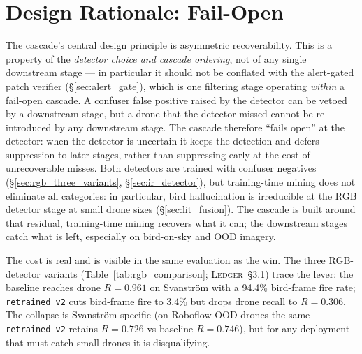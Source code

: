 \documentclass[12pt,a4paper,oneside,openright]{book}
\begin{document}
\section{Design Rationale: Fail-Open}
\label{sec:design_rationale}

The cascade's central design principle is asymmetric recoverability. This is a property of the \emph{detector choice and cascade ordering}, not of any single downstream stage --- in particular it should not be conflated with the alert-gated patch verifier (\S\ref{sec:alert_gate}), which is one filtering stage operating \emph{within} a fail-open cascade. A confuser false positive raised by the detector can be vetoed by a downstream stage, but a drone that the detector missed cannot be re-introduced by any downstream stage. The cascade therefore ``fails open'' at the detector: when the detector is uncertain it keeps the detection and defers suppression to later stages, rather than suppressing early at the cost of unrecoverable misses. Both detectors are trained with confuser negatives (\S\ref{sec:rgb_three_variants}, \S\ref{sec:ir_detector}), but training-time mining does not eliminate all categories: in particular, bird hallucination is irreducible at the RGB detector stage at small drone sizes (\S\ref{sec:lit_fusion}). The cascade is built around that residual, training-time mining recovers what it can; the downstream stages catch what is left, especially on bird-on-sky and OOD imagery.

The cost is real and is visible in the same evaluation as the win. The three RGB-detector variants (Table~\ref{tab:rgb_comparison}; \textsc{Ledger}~\S3.1) trace the lever: the baseline reaches drone $R=0.961$ on Svanstr\"om with a 94.4\% bird-frame fire rate; \texttt{retrained\_v2} cuts bird-frame fire to 3.4\% but drops drone recall to $R=0.306$. The collapse is Svanstr\"om-specific (on Roboflow OOD drones the same \texttt{retrained\_v2} retains $R=0.726$ vs baseline $R=0.746$), but for any deployment that must catch small drones it is disqualifying.
\end{document}
